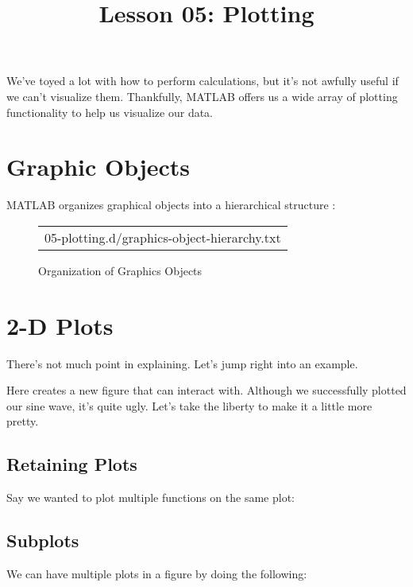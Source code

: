 \documentclass{article}
\title{Lesson 05: Plotting}
\begin{document}
\renderTitle

We've toyed a lot with how to perform calculations, but it's not awfully
useful if we can't visualize them.  Thankfully, MATLAB offers us a wide
array of plotting functionality to help us visualize our data.

\section{Graphic Objects}

MATLAB organizes graphical objects into a hierarchical structure%
:

\begin{figure}[!ht]
\Centering
\small
\begin{tabular}{c}
	{05-plotting.d/graphics-object-hierarchy.txt}
\end{tabular}
\caption{Organization of Graphics Objects}
\end{figure}

\section{2-D Plots}

There's not much point in explaining.  Let's jump right into an example.


Here  creates a new figure that  can interact with.  Although we
successfully plotted our sine wave, it's quite ugly.  Let's take the
liberty to make it a little more pretty.


\subsection{Retaining Plots}

Say we wanted to plot multiple functions on the same plot:



\subsection{Subplots}

We can have multiple plots in a figure by doing the following:


\end{document}
